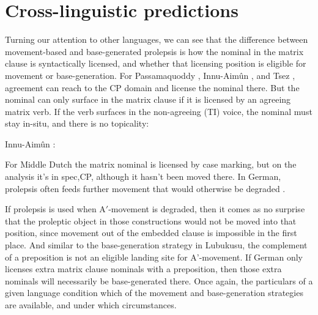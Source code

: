 \documentclass[output=paper,colorlinks,citecolor=brown]{langscibook}
\begin{document}
\section{Cross-linguistic predictions}\label{sec:newkirk:5}

Turning our attention to other languages, we can see that the difference between movement-based and base-generated prolepsis is how the nominal in the matrix clause is syntactically licensed, and whether that licensing position is eligible for movement or base-generation. For Passamaquoddy \citep{Bruening2001},  Innu-Aimûn \citep{BraniganMacKenzie2002}, and Tsez \citep{PolinskyPotsdam2001}, agreement can reach to the CP domain and license the nominal there. But the nominal can only surface in the matrix clause if it is licensed by an agreeing matrix verb. If the verb surfaces in the non-agreeing (TI) voice, the nominal must stay in-situ, and there is no topicality:

\ea%
	\label{ex:newkirk:41} 
	Innu-Aimûn \citep{BraniganMacKenzie2002}: 
	\z
\z


For Middle Dutch the matrix nominal is licensed by case marking, but on the analysis \citet{VanKoppenEtAl2016} it's in spec,CP, although it hasn't been moved there. In German, prolepsis often feeds further movement that would otherwise be degraded \citep{Salzmann2017Chapter}.


If prolepsis is used when A$'$-movement is degraded, then it comes as no surprise that the proleptic object in those constructions would not be moved into that position, since movement out of the embedded clause is impossible in the first place. And similar to the base-generation strategy in Lubukusu, the complement of a preposition is not an eligible landing site for A'-movement. If German only licenses extra matrix clause nominals with a preposition, then those extra nominals will necessarily be base-generated there. Once again, the particulars of a given language condition which of the movement and base-generation strategies are available, and under which circumstances.
\end{document}
